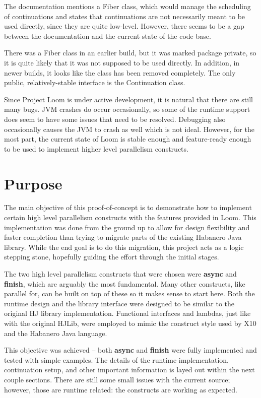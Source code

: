 \documentclass[12pt]{article}
\begin{document}
    The documentation mentions a Fiber class, which would manage the scheduling of continuations and states
    that continuations are not necessarily meant to be used directly, since they are quite low-level.
    However, there seems to be a gap between the documentation and the current state of the code base. 

    There was a Fiber class in an earlier build, but it was marked package private, so it is quite likely
    that it was not supposed to be used directly. In addition, in newer builds, it looks like the class has
    been removed completely. The only public, relatively-stable interface is the Continuation class. 

    Since Project Loom is under active development, it is natural that there are still many bugs. JVM crashes
    do occur occasionally, so some of the runtime support does seem to have some issues that need to be
    resolved. Debugging also occasionally causes the JVM to crash as well which is not ideal. However, for
    the most part, the current state of Loom is stable enough and feature-ready enough to be used to
    implement higher level parallelism constructs.

    \section{Purpose}

    The main objective of this proof-of-concept is to demonstrate how to implement certain high level
    parallelism constructs with the features provided in Loom. This implementation was done from the ground
    up to allow for design flexibility and faster completion than trying to migrate parts of the existing
    Habanero Java library. While the end goal is to do this migration, this project acts as a logic stepping
    stone, hopefully guiding the effort through the initial stages.

    The two high level parallelism constructs that were chosen were \textbf{async} and \textbf{finish}, which
    are arguably the most fundamental. Many other constructs, like parallel for, can be built on top of these
    so it makes sense to start here. Both the runtime design and the library interface were designed to be
    similar to the original HJ library implementation. Functional interfaces and lambdas, just like with the
    original HJLib, were employed to mimic the construct style used by X10 and the Habanero Java language.

    This objective was achieved -- both \textbf{async} and \textbf{finish} were fully implemented and tested
    with simple examples. The details of the runtime implementation, continuation setup, and other important
    information is layed out within the next couple sections. There are still some small issues with the
    current source; however, those are runtime related: the constructs are working as expected. 
\end{document}
